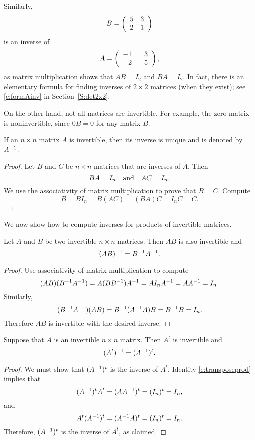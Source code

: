 \documentclass{ximera}
\begin{document}
Similarly,  
\[
B = \left(\begin{array}{rr} 5 & 3\\ 2 &1\end{array}\right)
\]
is an inverse of 
\[
A = \left(\begin{array}{rr} -1 & 3\\ 2 &-5\end{array}\right),
\]
as matrix multiplication shows that $AB=I_2$ and $BA=I_2$. In fact, there is 
an elementary formula for finding inverses of $2\times 2$ matrices (when they 
exist); see \eqref{e:formAinv} in Section~\ref{S:det2x2}.

On the other hand, not all matrices are invertible.  For example, the zero 
matrix is noninvertible, since $0B=0$ for any matrix $B$.

\begin{lemma} \label{B=C}
If an $n\times n$ matrix $A$ is invertible, then its inverse is unique
and is denoted by $A^{-1}$.
\end{lemma}

\begin{proof}
Let $B$ and $C$ be $n\times n$ matrices that are inverses of $A$.  Then
\[
BA=I_n \quad\mbox{and}\quad AC=I_n.
\]
We use the associativity of matrix multiplication to
prove that $B=C$.  Compute
\[
B = BI_n = B(AC) = (BA)C = I_nC = C.
\]
\end{proof}

We now show how to compute inverses for products of invertible
matrices.

\begin{proposition} \label{P:invprod} 
Let $A$ and $B$ be two invertible $n\times n$ matrices.  Then
$AB$ is also invertible and
\[
(AB)^{-1} = B^{-1} A^{-1}.
\]
\end{proposition}

\begin{proof}  Use associativity of matrix multiplication to compute
\[
(AB)(B^{-1} A^{-1}) = A(BB^{-1})A^{-1} = AI_nA^{-1} = AA^{-1}=I_n.
\]
Similarly,
\[
(B^{-1} A^{-1})(AB) = B^{-1}(A^{-1} A)B = B^{-1} B = I_n.
\]
Therefore $AB$ is invertible with the desired inverse. \end{proof}

\begin{proposition} \label{L:transposeinv} 
Suppose that $A$ is an invertible $n\times n$ matrix.  Then
$A^t$ is invertible and
\[
(A^t)^{-1} = (A^{-1})^t.
\]
\end{proposition}

\begin{proof}  We must show that $(A^{-1})^t$ is the inverse of $A^t$.  Identity
\eqref{e:transposeprod} implies that
\[
(A^{-1})^tA^t = (AA^{-1})^t = (I_n)^t = I_n,
\]
and
\[
A^t(A^{-1})^t = (A^{-1} A)^t = (I_n)^t = I_n.
\]
Therefore, $(A^{-1})^t$ is the inverse of $A^t$, as claimed.  \end{proof}
\end{document}
